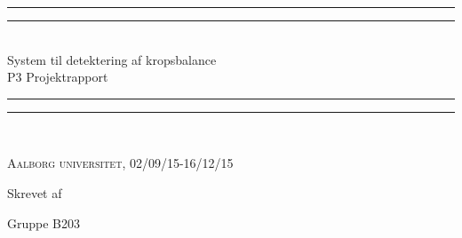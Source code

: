 \clearpage
\thispagestyle{empty}




\begin{center}
\vspace*{\baselineskip}
\rule{\textwidth}{1.6pt}\vspace*{-\baselineskip}\vspace*{2pt} %
\rule{\textwidth}{0.4pt}\\[\baselineskip] %

{\LARGE System til detektering af kropsbalance\\[0.3\baselineskip] \large P3 Projektrapport}\\[0.2\baselineskip] %

\rule{\textwidth}{0.4pt}\vspace*{-\baselineskip}\vspace{3.2pt} %
\rule{\textwidth}{1.6pt}\\[\baselineskip] %

\vspace*{3\baselineskip}

\scshape %
Aalborg universitet,  02/09/15-16/12/15 \par %

\vspace*{2\baselineskip} %

Skrevet af \\[\baselineskip]
{\Large Gruppe B203\par}
\end{center} %

